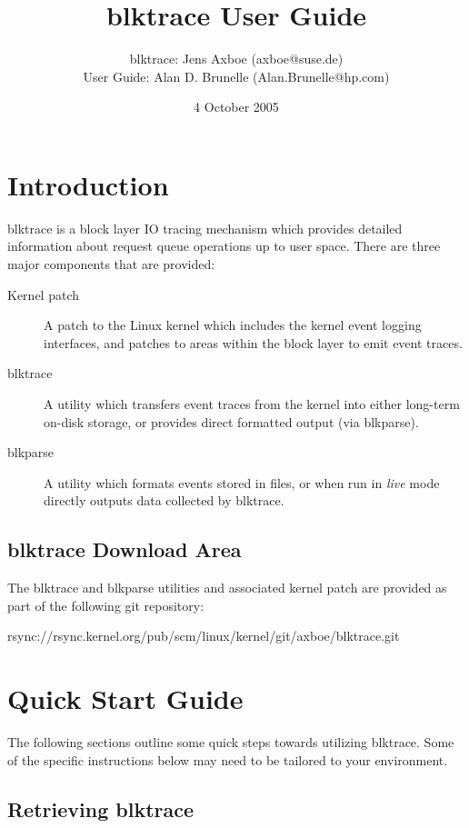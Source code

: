 \documentclass{article}
\title{blktrace User Guide}
\author{blktrace: Jens Axboe (axboe@suse.de)\\
        User Guide: Alan D. Brunelle (Alan.Brunelle@hp.com)}
\date{4 October 2005}
\begin{document}
\maketitle
\section{\label{sec:intro}Introduction}

blktrace is a block layer IO tracing mechanism which provides detailed
information about request queue operations up to user space. There are
three major components that are provided:

\begin{description}
  \item[Kernel patch] A patch to the Linux kernel which includes the
  kernel event logging interfaces, and patches to areas within the block
  layer to emit event traces.

  \item[blktrace] A utility which transfers event traces from the kernel
  into either long-term on-disk storage, or provides direct formatted
  output (via blkparse).

  \item[blkparse] A utility which formats events stored in files, or when
  run in \emph{live} mode directly outputs data collected by blktrace.
\end{description}

\subsection{blktrace Download Area}

The blktrace and blkparse utilities and associated kernel patch are provided
as part of the following git repository:

rsync://rsync.kernel.org/pub/scm/linux/kernel/git/axboe/blktrace.git

\newpage\section{\label{sec:quick-start}Quick Start Guide}

The following sections outline some quick steps towards utilizing
blktrace. Some of the specific instructions below may need to be tailored
to your environment.

\subsection{\label{sec:get-blktrace}Retrieving blktrace}
\end{document}
